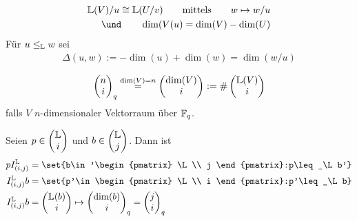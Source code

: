 \begin{satz}
	\begin{align*}
		\L(V)/u\cong\L(U/v)
		\qquad\text{mittels}\qquad
		w\mapsto w/u\\
		\und\qquad
		\dim(V(u)=\dim(V)-\dim(U)
	\end{align*}
	Für $u\leq_{\mathbb{L}} w$ sei 
	\begin{align*}
		\Delta(u,w):=-\dim(u)+\dim(w)=\dim(w/u)
	\end{align*}
\end{satz}

\begin{align*}
	\begin{pmatrix}
		n\\
		i
	\end{pmatrix}_q\overset{\dim(V)=n}{=}
	\begin{pmatrix}
		\dim(V)\\
		i
	\end{pmatrix}:=
	\#\begin{pmatrix}
		\mathbb{L}(V)\\
		i
	\end{pmatrix}
\end{align*}
falls $V$ $n$-dimensionaler Vektorraum über $\mathbb{F}_q$.

\begin{figure}[H]
	\begin{center}
			
		\end{center}
\end{figure}

Seien $p\in\begin{pmatrix}
	\mathbb{L}\\
	i
\end{pmatrix}$ und $b\in\begin{pmatrix}
	\mathbb{L}\\
	j
\end{pmatrix}$.
Dann ist
\begin{align*}
	p I_{(i,j)}^\L&=\set{b\in'\begin{pmatrix}
		\L\\
		j
	\end{pmatrix}:p\leq_\L b'}\\
	I_{(i,j)}^\L b&=\set{p'\in\begin{pmatrix}
		\L\\
		i
	\end{pmatrix}:p'\leq_\L b}\\
	I_{(i,j)}^\L b&=\begin{pmatrix}
		\L(b)\\
		i
	\end{pmatrix}\mapsto
	\begin{pmatrix}
		\dim(b)\\
		i
	\end{pmatrix}_q=\begin{pmatrix}
		j\\
		i
	\end{pmatrix}_q
\end{align*}

